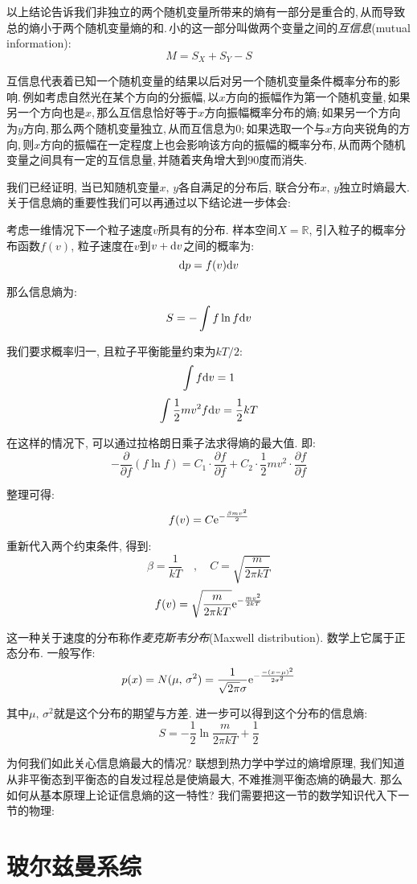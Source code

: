 以上结论告诉我们非独立的两个随机变量所带来的熵有一部分是重合的,\,从而导致总的熵小于两个随机变量熵的和.\,小的这一部分叫做两个变量之间的\emph{互信息}(mutual information):
\[M=S_X+S_Y-S\]

互信息代表着已知一个随机变量的结果以后对另一个随机变量条件概率分布的影响.\,例如考虑自然光在某个方向的分振幅,\,以$x$方向的振幅作为第一个随机变量,\,如果另一个方向也是$x$,\,那么互信息恰好等于$x$方向振幅概率分布的熵;\,如果另一个方向为$y$方向,\,那么两个随机变量独立,\,从而互信息为$0$;\,如果选取一个与$x$方向夹锐角的方向,\,则$x$方向的振幅在一定程度上也会影响该方向的振幅的概率分布,\,从而两个随机变量之间具有一定的互信息量,\,并随着夹角增大到$90$度而消失.

我们已经证明, 当已知随机变量$x,\,y$各自满足的分布后, 联合分布$x,\,y$独立时熵最大. 关于信息熵的重要性我们可以再通过以下结论进一步体会:

考虑一维情况下一个粒子速度$v$所具有的分布. 样本空间$X=\mathbb{R}$, 引入粒子的概率分布函数$f(v)$, 粒子速度在$v$到$v+\textrm{d} v$之间的概率为:
\[\textrm{d} p=f(v)\textrm{d} v\]

那么信息熵为:
\[S=-\int f\ln f\textrm{d} v\]

我们要求概率归一, 且粒子平衡能量约束为$kT/2$:
\[\int f\textrm{d} v=1\]
\[\int \frac{1}{2}mv^2 f\textrm{d} v=\frac{1}{2}kT\]

在这样的情况下, 可以通过拉格朗日乘子法求得熵的最大值. 即:
\[-\frac{\partial}{\partial f}(f\ln f)=C_1\cdot \frac{\partial f}{\partial f}+C_2\cdot\frac{1}{2}mv^2\cdot \frac{\partial f}{\partial f}\]

整理可得:
\[f(v)=C{\rm e}^{-\frac{\beta mv^2}{2}}\]

重新代入两个约束条件, 得到:
\[\beta=\frac{1}{kT} \quad,\quad C=\sqrt{\frac{m}{2\pi kT}}\]
\[f(v)=\sqrt{\frac{m}{2\pi kT}}{\rm e}^{-\frac{mv^2}{2kT}}\]

这一种关于速度的分布称作\emph{麦克斯韦分布}(Maxwell distribution). 数学上它属于正态分布. 一般写作:
\[p(x)=N(\mu,\,\sigma^2)=\frac{1}{\sqrt{2\pi }\sigma }{\rm e}^{-\frac{-(x-\mu)^2}{2\sigma^2}}\]

其中$\mu,\,\sigma^2$就是这个分布的期望与方差. 进一步可以得到这个分布的信息熵:
\[S=-\frac{1}{2}\ln{\frac{m}{2\pi kT}}+\frac{1}{2}\]

为何我们如此关心信息熵最大的情况? 联想到热力学中学过的熵增原理, 我们知道从非平衡态到平衡态的自发过程总是使熵最大, 不难推测平衡态熵的确最大. 那么如何从基本原理上论证信息熵的这一特性? 我们需要把这一节的数学知识代入下一节的物理:

\section{玻尔兹曼系综}

